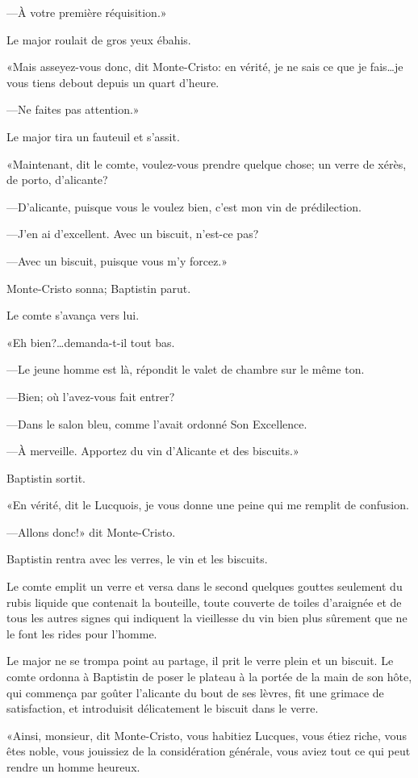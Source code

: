 —À votre première réquisition.» 

Le major roulait de gros yeux ébahis. 

«Mais asseyez-vous donc, dit Monte-Cristo: en vérité, je ne sais ce que je fais\dots je vous tiens debout depuis un quart d'heure. 

—Ne faites pas attention.» 

Le major tira un fauteuil et s'assit. 

«Maintenant, dit le comte, voulez-vous prendre quelque chose; un verre de xérès, de porto, d'alicante? 

—D'alicante, puisque vous le voulez bien, c'est mon vin de prédilection. 

—J'en ai d'excellent. Avec un biscuit, n'est-ce pas? 

—Avec un biscuit, puisque vous m'y forcez.» 

Monte-Cristo sonna; Baptistin parut. 

Le comte s'avança vers lui. 

«Eh bien?\dots demanda-t-il tout bas. 

—Le jeune homme est là, répondit le valet de chambre sur le même ton. 

—Bien; où l'avez-vous fait entrer? 

—Dans le salon bleu, comme l'avait ordonné Son Excellence. 

—À merveille. Apportez du vin d'Alicante et des biscuits.» 

Baptistin sortit. 

«En vérité, dit le Lucquois, je vous donne une peine qui me remplit de confusion.  

—Allons donc!» dit Monte-Cristo. 

Baptistin rentra avec les verres, le vin et les biscuits. 

Le comte emplit un verre et versa dans le second quelques gouttes seulement du rubis liquide que contenait la bouteille, toute couverte de toiles d'araignée et de tous les autres signes qui indiquent la vieillesse du vin bien plus sûrement que ne le font les rides pour l'homme. 

Le major ne se trompa point au partage, il prit le verre plein et un biscuit. Le comte ordonna à Baptistin de poser le plateau à la portée de la main de son hôte, qui commença par goûter l'alicante du bout de ses lèvres, fit une grimace de satisfaction, et introduisit délicatement le biscuit dans le verre. 

«Ainsi, monsieur, dit Monte-Cristo, vous habitiez Lucques, vous étiez riche, vous êtes noble, vous jouissiez de la considération générale, vous aviez tout ce qui peut rendre un homme heureux. 

